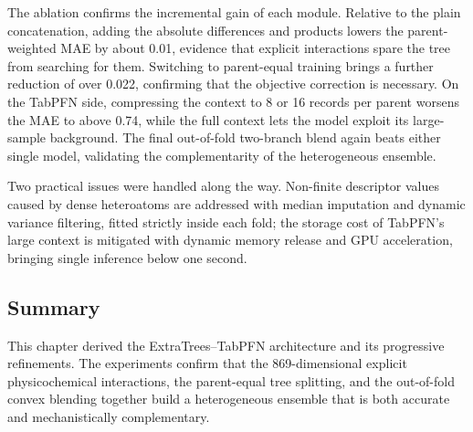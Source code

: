 The ablation confirms the incremental gain of each module. Relative to the plain concatenation, adding the absolute differences and products lowers the parent-weighted MAE by about 0.01, evidence that explicit interactions spare the tree from searching for them. Switching to parent-equal training brings a further reduction of over 0.022, confirming that the objective correction is necessary. On the TabPFN side, compressing the context to 8 or 16 records per parent worsens the MAE to above 0.74, while the full context lets the model exploit its large-sample background. The final out-of-fold two-branch blend again beats either single model, validating the complementarity of the heterogeneous ensemble.

Two practical issues were handled along the way. Non-finite descriptor values caused by dense heteroatoms are addressed with median imputation and dynamic variance filtering, fitted strictly inside each fold; the storage cost of TabPFN's large context is mitigated with dynamic memory release and GPU acceleration, bringing single inference below one second.

\subsection{Summary}

This chapter derived the ExtraTrees--TabPFN architecture and its progressive refinements. The experiments confirm that the 869-dimensional explicit physicochemical interactions, the parent-equal tree splitting, and the out-of-fold convex blending together build a heterogeneous ensemble that is both accurate and mechanistically complementary.
